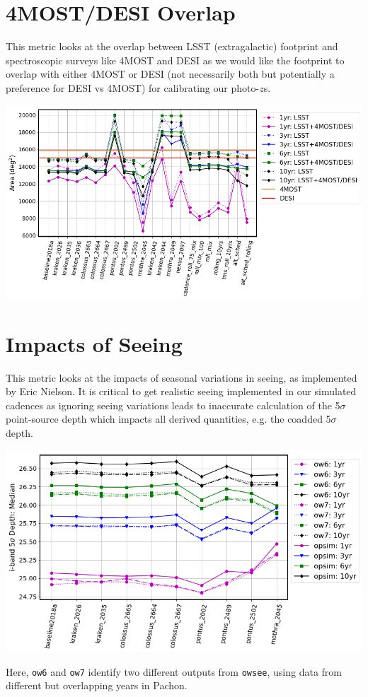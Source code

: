 \documentclass[a4paper,10pt]{article}
\newcommand{\ttt}[1]{\texttt{#1}}
\begin{document}
\newpage
\section*{4MOST/DESI Overlap\label{4MOST+DESI overlap}}
This metric looks at the overlap between LSST (extragalactic) footprint and spectroscopic surveys like 4MOST and DESI as we would like the footprint to overlap with either 4MOST or DESI (not necessarily both but potentially a preference for DESI vs 4MOST) for calibrating our photo-$z$s.

\begin{minipage}{\columnwidth}
\vspace*{2em}
\centering
 \includegraphics[width=.8\columnwidth]{lss_compare_LSST+4MOSTorDESI_overlap_22dbs.png}
\vspace*{2em}
\end{minipage}

\newpage
\section*{Impacts of Seeing\label{seeing}}
This metric looks at the impacts of seasonal variations in seeing, as implemented by Eric Nielson. It is critical to get realistic seeing implemented in our simulated cadences as ignoring seeing variations leads to inaccurate calculation of the 5$\sigma$ point-source depth which impacts all derived quantities, e.g. the coadded 5$\sigma$ depth.

\begin{minipage}{\columnwidth}
\centering
\vspace*{2em}
\includegraphics[width=.75\columnwidth]{lss_compare_depth_median_10dbs_ow6_ow7_opsim.png}
\vspace*{2em}
\end{minipage}

Here, \ttt{ow6} and \ttt{ow7} identify two different outputs from \ttt{owsee}, using data from different but overlapping years in Pachon.
\end{document}
